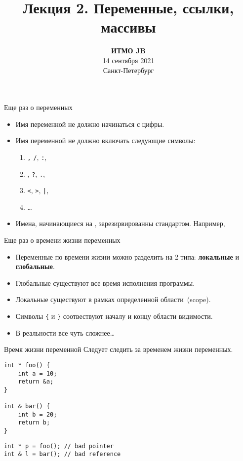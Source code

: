 \documentclass{beamer}
\title{Лекция 2. Переменные, ссылки, массивы}
\date{
   \textbf{ИТМО JB}\\
   14 сентября 2021 \\
   Санкт-Петербург
}
\begin{document}
\begin{frame} 
  \titlepage
\end{frame}

\begin{frame}[fragile]{Еще раз о переменных}
    \begin{itemize}
        \item Имя переменной не должно начинаться с цифры.
        \item Имя переменной не должно включать следующие символы: \\
        \begin{enumerate}
            \item {\tt ,} {\tt /}, {\tt :},
            \item {\tt *}, {\tt ?}, {\tt .},
            \item {\tt <}, {\tt >}, {\tt |},
            \item \dots
        \end{enumerate}
        \item Имена, начинающиеся на \code{\_\_}, зарезирвированны стандартом. Например, 
    \end{itemize}
\end{frame}

\begin{frame}[fragile]{Еще раз о времени жизни переменных}
    \begin{itemize}
        \item Переменные по времени жизни можно разделить на 2 типа: {\bf локальные} и {\bf глобальные}.
        \item Глобальные существуют все время исполнения программы.
        \item Локальные существуют в рамках определенной области~(scope).
        \item Символы {\tt \{} и {\tt \}} соотвествуют началу и концу области видимости.
        \item В реальности все чуть сложнее\dots
    \end{itemize}
\end{frame}

\begin{frame}[fragile]{Время жизни переменной}
    Следует следить за временем жизни переменных.
    \begin{lstlisting}
int * foo() {
    int a = 10;
    return &a;
}

int & bar() {
    int b = 20;
    return b;
}
    \end{lstlisting}
    \begin{lstlisting}
int * p = foo(); // bad pointer
int & l = bar(); // bad reference
    \end{lstlisting}
\end{frame}
\end{document}
